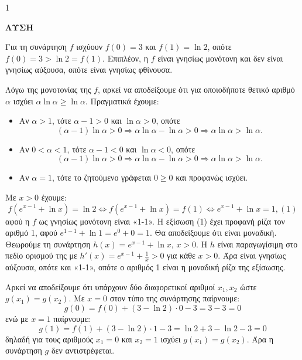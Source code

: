 \begin{ylh}{1}
    \item [Ύλη από εικόνα]
\end{ylh}
\textbf{ΛΥΣΗ}

\begin{alist}
\item Για τη συνάρτηση $f$ ισχύουν $f(0)=3$ και $f(1)=\ln2$, οπότε $f(0)=3>\ln2=f(1)$. Επιπλέον, η $f$ είναι γνησίως μονότονη και δεν είναι γνησίως αύξουσα, οπότε είναι γνησίως φθίνουσα.
\item Λόγω της μονοτονίας της $f$, αρκεί να αποδείξουμε ότι για οποιοδήποτε θετικό αριθμό $\alpha$ ισχύει $\alpha\ln\alpha \ge \ln\alpha$.
Πραγματικά έχουμε:
\begin{itemize}
    \item Αν $\alpha>1$, τότε $\alpha-1>0$ και $\ln\alpha>0$, οπότε
    \[ (\alpha-1)\ln\alpha > 0 \Rightarrow \alpha\ln\alpha - \ln\alpha > 0 \Rightarrow \alpha\ln\alpha > \ln\alpha. \]
    \item Αν $0<\alpha<1$, τότε $\alpha-1<0$ και $\ln\alpha<0$, οπότε
    \[ (\alpha-1)\ln\alpha > 0 \Rightarrow \alpha\ln\alpha - \ln\alpha > 0 \Rightarrow \alpha\ln\alpha > \ln\alpha. \]
    \item Αν $\alpha=1$, τότε το ζητούμενο γράφεται $0 \ge 0$ και προφανώς ισχύει.
\end{itemize}
\item Με $x>0$ έχουμε:
\[ f(e^{x-1}+\ln x)=\ln2 \Leftrightarrow f(e^{x-1}+\ln x)=f(1) \Leftrightarrow e^{x-1}+\ln x=1, (1) \]
αφού η $f$ ως γνησίως μονότονη είναι «1-1».
Η εξίσωση (1) έχει προφανή ρίζα τον αριθμό 1, αφού $e^{1-1}+\ln1=e^0+0=1$. Θα αποδείξουμε ότι είναι μοναδική.
Θεωρούμε τη συνάρτηση $h(x)=e^{x-1}+\ln x$, $x>0$. Η $h$ είναι παραγωγίσιμη στο πεδίο ορισμού της με $h'(x)=e^{x-1}+\frac{1}{x}>0$ για κάθε $x>0$. Άρα είναι γνησίως αύξουσα, οπότε και «1-1», οπότε ο αριθμός 1 είναι η μοναδική ρίζα της εξίσωσης.
\item Αρκεί να αποδείξουμε ότι υπάρχουν δύο διαφορετικοί αριθμοί $x_1, x_2$ ώστε $g(x_1)=g(x_2)$.
Με $x=0$ στον τύπο της συνάρτησης παίρνουμε:
\[ g(0)=f(0)+(3-\ln2)\cdot0-3=3-3=0 \]
ενώ με $x=1$ παίρνουμε:
\[ g(1)=f(1)+(3-\ln2)\cdot1-3=\ln2+3-\ln2-3=0 \]
δηλαδή για τους αριθμούς $x_1=0$ και $x_2=1$ ισχύει $g(x_1)=g(x_2)$.
Άρα η συνάρτηση $g$ δεν αντιστρέφεται.
\end{alist}